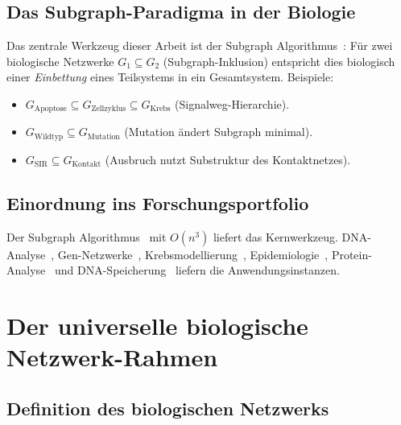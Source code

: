 ﻿\documentclass[a4paper,12pt]{article}
\theoremstyle{plain}
\theoremstyle{definition}
\theoremstyle{remark}
\newcommand{\Gkrebs}{G_{\mathrm{Krebs}}}
\begin{document}
\subsection{Das Subgraph-Paradigma in der Biologie}

Das zentrale Werkzeug dieser Arbeit ist der Subgraph Algorithmus~\cite{epp2026subgraph}:
F\"ur zwei biologische Netzwerke $G_1 \subseteq G_2$ (Subgraph-Inklusion)
entspricht dies biologisch einer \emph{Einbettung} eines Teilsystems
in ein Gesamtsystem. Beispiele:
\begin{itemize}
    \item $G_{\mathrm{Apoptose}} \subseteq G_{\mathrm{Zellzyklus}} \subseteq \Gkrebs$
          (Signalweg-Hierarchie).
    \item $G_{\mathrm{Wildtyp}} \subseteq G_{\mathrm{Mutation}}$
          (Mutation \"andert Subgraph minimal).
    \item $G_{\mathrm{SIR}} \subseteq G_{\mathrm{Kontakt}}$
          (Ausbruch nutzt Substruktur des Kontaktnetzes).
\end{itemize}

\subsection{Einordnung ins Forschungsportfolio}

Der Subgraph Algorithmus~\cite{epp2026subgraph} mit $O(n^3)$ liefert das Kernwerkzeug.
DNA-Analyse~\cite{epp2026dna}, Gen-Netzwerke~\cite{epp2026gen},
Krebsmodellierung~\cite{epp2026krebs,epp2026bloodc},
Epidemiologie~\cite{epp2026hantavirus,epp2026ebola,epp2026hiv,epp2026r0},
Protein-Analyse~\cite{epp2026norovirus} und
DNA-Speicherung~\cite{epp2026dnastor}
liefern die Anwendungsinstanzen.

\section{Der universelle biologische Netzwerk-Rahmen}

\subsection{Definition des biologischen Netzwerks}
\end{document}

